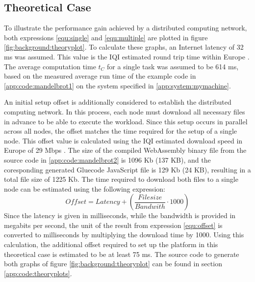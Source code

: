 \subsection{Theoretical Case}
To illustrate the performance gain achieved by a distributed computing network, both expressions \eqref{equ:single} and \eqref{equ:multiple} are plotted in figure \ref{fig:background:theoryplot}. To calculate these graphs, an Internet latency of 32 ms \cite{backend:latency} was assumed. This value is the \ac{IQI} estimated round trip time within Europe \cite{backend:latency}. The average computation time $t_{C}$ for a single task was assumed to be 614 ms, based on the measured average run time of the example code in \ref{app:code:mandelbrot1} on the system specified in \ref{app:system:mymachine}.

An initial setup offset is additionally considered to establish the distributed computing network. In this process, each node must download all necessary files in advance to be able to execute the workload. Since this setup occurs in parallel across all nodes, the offset matches the time required for the setup of a single node. This offset value is calculated using the \ac{IQI} estimated download speed in Europe of 29 Mbps \cite{backend:latency}. The size of the compiled WebAssembly binary file from the source code in \ref{app:code:mandelbrot2} is 1096 Kb (137 KB), and the coresponding generated Gluecode JavaScript file is 129 Kb (24 KB), resulting in a total file size of 1225 Kb. The time required to download both files to a single node can be estimated using the following expression:
\begin{equation}
 Offset = Latency + (\frac{Filesize}{Bandwith} \cdot 1000) 
 \label{equ:offset}
\end{equation}
Since the latency is given in milliseconds, while the bandwidth is provided in megabits per second, the unit of the result from expression \ref{equ:offset} is converted to milliseconds by multiplying the download time by 1000. Using this calculation, the additional offset required to set up the platform in this theoretical case is estimated to be at least 75 ms. The source code to generate both graphs of figure \ref{fig:background:theoryplot} can be found in section \ref{app:code:theoryplots}.

